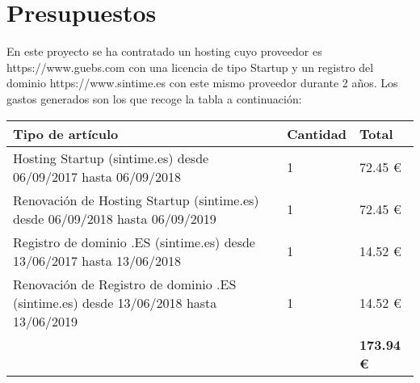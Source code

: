 \setcounter{chapter}{3}
\setcounter{section}{0}
\setcounter{subsection}{0}
\chapter{Presupuestos}

En este proyecto se ha contratado un hosting cuyo proveedor es https://www.guebs.com con una licencia de tipo Startup y un registro del dominio https://www.sintime.es con este mismo proveedor durante 2 años. Los gastos generados son los que recoge la tabla a continuación:\\

\begin{table}[h]
	\centering
	\begin{tabular}{| p{10cm} | p{1.6cm} | p{2.3cm} |}
		\rowcolor[HTML]{329A9D} 
		{\color[HTML]{FFFFFF} \textbf{Tipo de artículo}} & {\color[HTML]{FFFFFF} \textbf{Cantidad}} & {\color[HTML]{FFFFFF} \textbf{Total}} \\ \hline
		Hosting Startup (sintime.es) desde 06/09/2017 hasta 06/09/2018 & 1 & 72.45 \euro \\ \hline 
		Renovación de Hosting Startup (sintime.es) desde 06/09/2018 hasta 06/09/2019 & 1 & 72.45 \euro \\ \hline
		Registro de dominio .ES (sintime.es) desde 13/06/2017 hasta 13/06/2018 & 1 & 14.52 \euro \\ \hline
		Renovación de Registro de dominio .ES (sintime.es) desde 13/06/2018 hasta 13/06/2019 & 1 & 14.52 \euro \\ \hline
		 &  & \textbf{173.94 \euro }\\ \hline
	\end{tabular}
\end{table}
